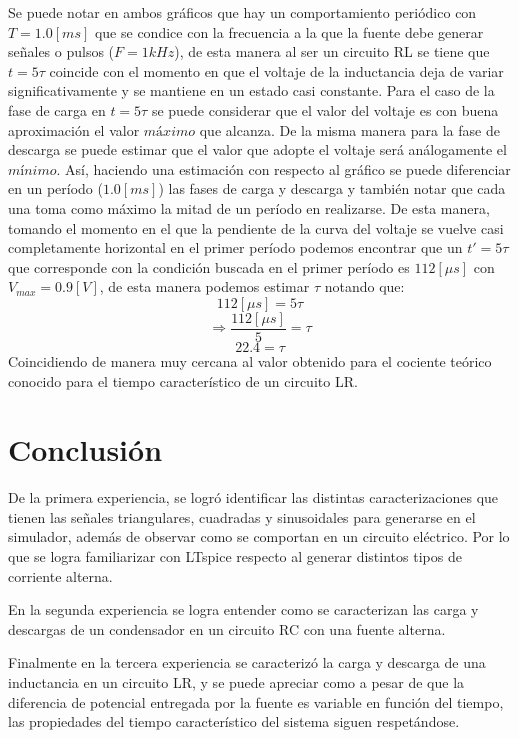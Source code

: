 \documentclass[letterpaper,11pt]{article} %
\begin{document}
Se puede notar en ambos gráficos que hay un comportamiento periódico con $T = 1.0[ms]$ que se condice con la frecuencia a la que la fuente debe generar señales o pulsos ($F = 1kHz$), de esta manera al ser un circuito RL se tiene que $t=5\tau$ coincide con el momento en que el voltaje de la inductancia deja de variar significativamente y se mantiene en un estado casi constante. Para el caso de la fase de carga en $t=5\tau$ se puede considerar que el valor del voltaje es con buena aproximación el valor $máximo$ que alcanza. De la misma manera para la fase de descarga se puede estimar que el valor que adopte el voltaje será análogamente el $mínimo$. Así, haciendo una estimación con respecto al gráfico se puede diferenciar en un período ($1.0[ms]$) las fases de carga y descarga y también notar que cada una toma como máximo la mitad de un período en realizarse.
De esta manera, tomando el momento en el que la pendiente de la curva del voltaje se vuelve casi completamente horizontal en el primer período podemos encontrar que un $t'=5\tau$ que corresponde con la condición buscada en el primer período es $112[\mu s]$ con $V_{max} = 0.9[V]$, de esta manera podemos estimar $\tau$ notando que:
$$112[\mu s] = 5\tau$$
$$\Rightarrow \frac{112[\mu s]}{5} = \tau$$
$$22.4 = \tau$$
Coincidiendo de manera muy cercana al valor obtenido para el cociente teórico conocido para el tiempo característico de un circuito LR.
\newpage 

\section{Conclusión}
De la primera experiencia, se logró identificar las distintas caracterizaciones que tienen las señales triangulares, cuadradas y sinusoidales para generarse en el simulador, además de observar como se comportan en un circuito eléctrico. Por lo que se logra familiarizar con LTspice respecto al generar distintos tipos de corriente alterna.

En la segunda experiencia se logra entender como se caracterizan las carga y descargas de un condensador en un circuito RC con una fuente alterna.

Finalmente en la tercera experiencia se caracterizó la carga y descarga de una inductancia en un circuito LR, y se puede apreciar como a pesar de que la diferencia de potencial entregada por la fuente es variable en función del tiempo, las propiedades del tiempo característico del sistema siguen respetándose.



\end{document}
